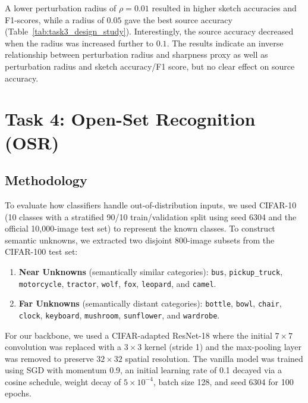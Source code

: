 \documentclass{article}
\begin{document}
A lower perturbation radius of $\rho = 0.01$ resulted in higher sketch accuracies and F1-scores, while a radius of $0.05$ gave the best source accuracy (Table~\ref{tab:task3_design_study}). Interestingly, the source accuracy decreased when the radius was increased further to $0.1$. The results indicate an inverse relationship between perturbation radius and sharpness proxy as well as perturbation radius and sketch accuracy/F1 score, but no clear effect on source accuracy.


\newpage
\section{Task 4: Open-Set Recognition (OSR)}
\label{sec:task4}

\subsection{Methodology}
To evaluate how classifiers handle out-of-distribution inputs, we used CIFAR-10 (10 classes with a stratified 90/10 train/validation split using seed 6304 and the official 10,000-image test set) to represent the known classes. To construct semantic unknowns, we extracted two disjoint 800-image subsets from the CIFAR-100 test set:
\begin{enumerate}
    \item \textbf{Near Unknowns} (semantically similar categories): \texttt{bus}, \texttt{pickup\_truck}, \texttt{motorcycle}, \texttt{tractor}, \texttt{wolf}, \texttt{fox}, \texttt{leopard}, and \texttt{camel}.
    \item \textbf{Far Unknowns} (semantically distant categories): \texttt{bottle}, \texttt{bowl}, \texttt{chair}, \texttt{clock}, \texttt{keyboard}, \texttt{mushroom}, \texttt{sunflower}, and \texttt{wardrobe}.
\end{enumerate}

For our backbone, we used a CIFAR-adapted ResNet-18 where the initial $7 \times 7$ convolution was replaced with a $3 \times 3$ kernel (stride 1) and the max-pooling layer was removed to preserve $32 \times 32$ spatial resolution. The vanilla model was trained using SGD with momentum 0.9, an initial learning rate of 0.1 decayed via a cosine schedule, weight decay of $5 \times 10^{-4}$, batch size 128, and seed 6304 for 100 epochs.
\end{document}
